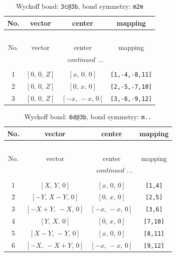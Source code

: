 \documentclass[fleqn,8pt]{jsarticle}
\begin{document}
\renewcommand{\arraystretch}{1.2}
\begin{longtable}{cccc}
\caption{Wyckoff bond: {\tt 3c@3b}, bond symmetry: {\tt m2m}}
 \\
 \hline \hline
No. & vector & center & mapping \\ \hline \endfirsthead

\multicolumn{3}{l}{\tablename\ \thetable{}} \\
 \hline \hline
No. & vector & center & mapping \\ \hline \endhead

 \hline \hline
\multicolumn{3}{r}{\footnotesize\it continued ...} \\ \endfoot

 \hline \hline
\multicolumn{3}{r}{} \\ \endlastfoot

1 & $\left[ 0,\, 0,\, Z \right]$ & $\left[ x,\, 0,\, 0 \right]$ & {\tt [1,-4,-8,11]} \\ \hline
2 & $\left[ 0,\, 0,\, Z \right]$ & $\left[ 0,\, x,\, 0 \right]$ & {\tt [2,-5,-7,10]} \\ \hline
3 & $\left[ 0,\, 0,\, Z \right]$ & $\left[ - x,\, - x,\, 0 \right]$ & {\tt [3,-6,-9,12]} \\
\end{longtable}
\renewcommand{\arraystretch}{1.2}
\begin{longtable}{cccc}
\caption{Wyckoff bond: {\tt 6d@3b}, bond symmetry: {\tt m..}}
 \\
 \hline \hline
No. & vector & center & mapping \\ \hline \endfirsthead

\multicolumn{3}{l}{\tablename\ \thetable{}} \\
 \hline \hline
No. & vector & center & mapping \\ \hline \endhead

 \hline \hline
\multicolumn{3}{r}{\footnotesize\it continued ...} \\ \endfoot

 \hline \hline
\multicolumn{3}{r}{} \\ \endlastfoot

1 & $\left[ X,\, Y,\, 0 \right]$ & $\left[ x,\, 0,\, 0 \right]$ & {\tt [1,4]} \\ \hline
2 & $\left[ - Y,\, X - Y,\, 0 \right]$ & $\left[ 0,\, x,\, 0 \right]$ & {\tt [2,5]} \\ \hline
3 & $\left[ - X + Y,\, - X,\, 0 \right]$ & $\left[ - x,\, - x,\, 0 \right]$ & {\tt [3,6]} \\ \hline
4 & $\left[ Y,\, X,\, 0 \right]$ & $\left[ 0,\, x,\, 0 \right]$ & {\tt [7,10]} \\ \hline
5 & $\left[ X - Y,\, - Y,\, 0 \right]$ & $\left[ x,\, 0,\, 0 \right]$ & {\tt [8,11]} \\ \hline
6 & $\left[ - X,\, - X + Y,\, 0 \right]$ & $\left[ - x,\, - x,\, 0 \right]$ & {\tt [9,12]} \\
\end{longtable}
\end{document}
